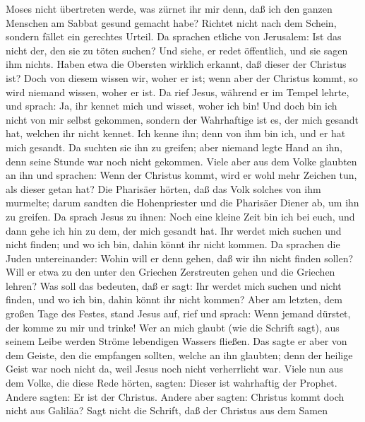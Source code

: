 Moses nicht übertreten werde, was zürnet ihr mir denn, daß ich den
ganzen Menschen am Sabbat gesund gemacht habe?  Richtet
nicht nach dem Schein, sondern fället ein gerechtes Urteil.
 Da sprachen etliche von Jerusalem: Ist das nicht der,
den sie zu töten suchen?  Und siehe, er redet öffentlich,
und sie sagen ihm nichts. Haben etwa die Obersten wirklich erkannt, daß
dieser der Christus ist?  Doch von diesem wissen wir,
woher er ist; wenn aber der Christus kommt, so wird niemand wissen,
woher er ist.  Da rief Jesus, während er im Tempel
lehrte, und sprach: Ja, ihr kennet mich und wisset, woher ich bin! Und
doch bin ich nicht von mir selbst gekommen, sondern der Wahrhaftige ist
es, der mich gesandt hat, welchen ihr nicht kennet.  Ich
kenne ihn; denn von ihm bin ich, und er hat mich gesandt.
 Da suchten sie ihn zu greifen; aber niemand legte Hand
an ihn, denn seine Stunde war noch nicht gekommen.  Viele
aber aus dem Volke glaubten an ihn und sprachen: Wenn der Christus
kommt, wird er wohl mehr Zeichen tun, als dieser getan hat?
 Die Pharisäer hörten, daß das Volk solches von ihm
murmelte; darum sandten die Hohenpriester und die Pharisäer Diener ab,
um ihn zu greifen.  Da sprach Jesus zu ihnen: Noch eine
kleine Zeit bin ich bei euch, und dann gehe ich hin zu dem, der mich
gesandt hat.  Ihr werdet mich suchen und nicht finden;
und wo ich bin, dahin könnt ihr nicht kommen.  Da
sprachen die Juden untereinander: Wohin will er denn gehen, daß wir ihn
nicht finden sollen? Will er etwa zu den unter den Griechen Zerstreuten
gehen und die Griechen lehren?  Was soll das bedeuten,
daß er sagt: Ihr werdet mich suchen und nicht finden, und wo ich bin,
dahin könnt ihr nicht kommen?  Aber am letzten, dem
großen Tage des Festes, stand Jesus auf, rief und sprach: Wenn jemand
dürstet, der komme zu mir und trinke!  Wer an mich glaubt
(wie die Schrift sagt), aus seinem Leibe werden Ströme lebendigen
Wassers fließen.  Das sagte er aber von dem Geiste, den
die empfangen sollten, welche an ihn glaubten; denn der heilige Geist
war noch nicht da, weil Jesus noch nicht verherrlicht war.
 Viele nun aus dem Volke, die diese Rede hörten, sagten:
Dieser ist wahrhaftig der Prophet.  Andere sagten: Er ist
der Christus. Andere aber sagten: Christus kommt doch nicht aus Galiläa?
 Sagt nicht die Schrift, daß der Christus aus dem Samen
